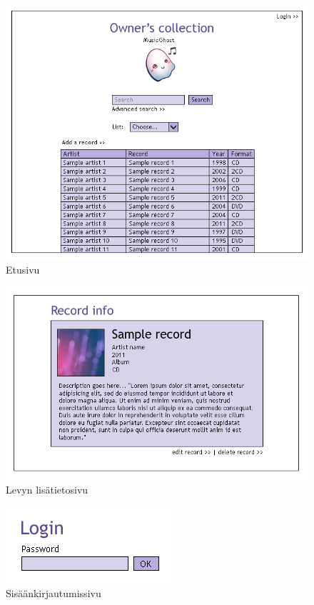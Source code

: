 \documentclass[a4paper,12pt]{report}
\begin{document}
\begin{figure}[H]
  \begin{center}
    \includegraphics[width=\textwidth]{uidraft/mainwindow2}
  \end{center}
  \caption{Etusivu}
\end{figure}

\begin{figure}[H]
  \begin{center}
    \includegraphics[width=\textwidth]{uidraft/recordinfopage}
  \end{center}
  \caption{Levyn lisätietosivu}
\end{figure}

\begin{figure}[H]
  \begin{center}
    \includegraphics[]{uidraft/login}
  \end{center}
  \caption{Sisäänkirjautumissivu}
\end{figure}
\end{document}
